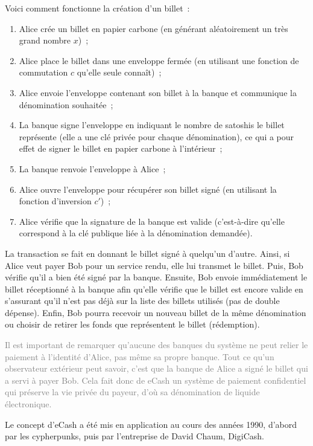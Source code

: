 Voici comment fonctionne la création d'un billet~:

\begin{enumerate}
\item Alice crée un billet en papier carbone (en générant aléatoirement un très grand nombre $x$)~;
\item Alice place le billet dans une enveloppe fermée (en utilisant une fonction de commutation $c$ qu'elle seule connaît)~;
\item Alice envoie l'enveloppe contenant son billet à la banque et communique la dénomination souhaitée~;
\item La banque signe l'enveloppe en indiquant le nombre de satoshis le billet représente (elle a une clé privée pour chaque dénomination), ce qui a pour effet de signer le billet en papier carbone à l'intérieur~;
\item La banque renvoie l'enveloppe à Alice~;
\item Alice ouvre l'enveloppe pour récupérer son billet signé (en utilisant la fonction d'inversion $c'$)~;
\item Alice vérifie que la signature de la banque est valide (c'est-à-dire qu'elle correspond à la clé publique liée à la dénomination demandée).
\end{enumerate}

La transaction se fait en donnant le billet signé à quelqu'un d'autre. Ainsi, si Alice veut payer Bob pour un service rendu, elle lui transmet le billet. Puis, Bob vérifie qu'il a bien été signé par la banque. Ensuite, Bob envoie immédiatement le billet réceptionné à la banque afin qu'elle vérifie que le billet est encore valide en s'assurant qu'il n'est pas déjà sur la liste des billets utilisés (pas de double dépense). Enfin, Bob pourra recevoir un nouveau billet de la même dénomination ou choisir de retirer les fonds que représentent le billet (rédemption).

\textcolor{gray}{Il est important de remarquer qu'aucune des banques du système ne peut relier le paiement à l'identité d'Alice, pas même sa propre banque. Tout ce qu'un observateur extérieur peut savoir, c'est que la banque de Alice a signé le billet qui a servi à payer Bob. Cela fait donc de eCash un système de paiement confidentiel qui préserve la vie privée du payeur, d'où sa dénomination de liquide électronique.}


Le concept d'eCash a été mis en application au cours des années 1990, d'abord par les cypherpunks, puis par l'entreprise de David Chaum, DigiCash.

